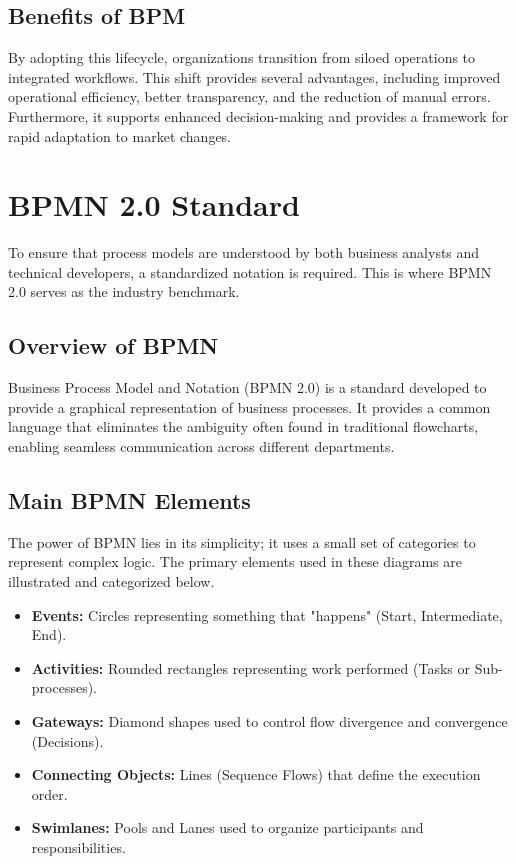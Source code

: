 \subsection{Benefits of BPM}

By adopting this lifecycle, organizations transition from siloed operations to integrated workflows. This shift provides several advantages, including improved operational efficiency, better transparency, and the reduction of manual errors. Furthermore, it supports enhanced decision-making and provides a framework for rapid adaptation to market changes.

\section{BPMN 2.0 Standard}

To ensure that process models are understood by both business analysts and technical developers, a standardized notation is required. This is where BPMN 2.0 serves as the industry benchmark.

\subsection{Overview of BPMN}

Business Process Model and Notation (BPMN 2.0) is a standard developed to provide a graphical representation of business processes. It provides a common language that eliminates the ambiguity often found in traditional flowcharts, enabling seamless communication across different departments.

\subsection{Main BPMN Elements}

The power of BPMN lies in its simplicity; it uses a small set of categories to represent complex logic. The primary elements used in these diagrams are illustrated and categorized below.

\begin{itemize}
    \item \textbf{Events:} Circles representing something that "happens" (Start, Intermediate, End).
    \item \textbf{Activities:} Rounded rectangles representing work performed (Tasks or Sub-processes).
    \item \textbf{Gateways:} Diamond shapes used to control flow divergence and convergence (Decisions).
    \item \textbf{Connecting Objects:} Lines (Sequence Flows) that define the execution order.
    \item \textbf{Swimlanes:} Pools and Lanes used to organize participants and responsibilities.
\end{itemize}


